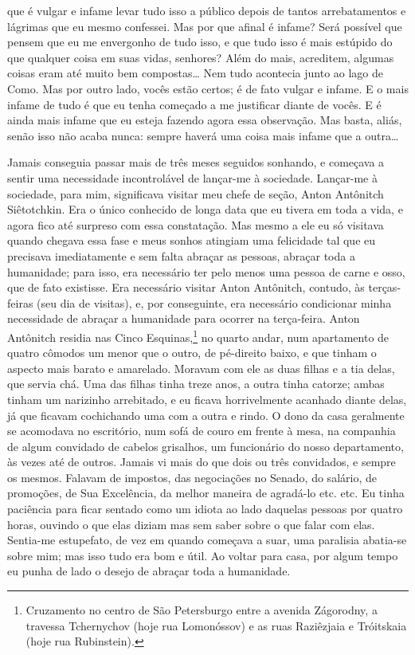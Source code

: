 que é vulgar e infame levar tudo isso a público depois de tantos
arrebatamentos e lágrimas que eu mesmo confessei. Mas por que afinal é
infame? Será possível que pensem que eu me envergonho de tudo isso, e
que tudo isso é mais estúpido do que qualquer coisa em suas vidas,
senhores? Além do mais, acreditem, algumas coisas eram até muito bem
compostas\ldots{} Nem tudo acontecia junto ao lago de Como. Mas por outro
lado, vocês estão certos; é de fato vulgar e infame. E o mais infame de
tudo é que eu tenha começado a me justificar diante de vocês. E é ainda
mais infame que eu esteja fazendo agora essa observação. Mas basta,
aliás, senão isso não acaba nunca: sempre haverá uma coisa mais infame
que a outra\ldots{}

Jamais conseguia passar mais de três meses seguidos sonhando, e começava
a sentir uma necessidade incontrolável de lançar-me à sociedade. Lançar-me
à sociedade, para mim, significava visitar meu chefe de seção, Anton
Antônitch Siêtotchkin. Era o único conhecido de longa data que eu
tivera em toda a vida, e agora fico até surpreso com essa constatação.
Mas mesmo a ele eu só visitava quando chegava essa fase e meus sonhos
atingiam uma felicidade tal que eu precisava imediatamente e sem falta
abraçar as pessoas, abraçar toda a humanidade; para isso, era
necessário ter pelo menos uma pessoa de carne e osso, que de fato
existisse. Era necessário visitar Anton Antônitch, contudo, às
terças-feiras (seu dia de visitas), e, por conseguinte, era necessário
condicionar minha necessidade de abraçar a humanidade para ocorrer na
terça-feira. Anton Antônitch residia nas Cinco Esquinas,\footnote{
Cruzamento no centro de São Petersburgo entre a avenida Zágorodny, a
travessa Tchernychov (hoje rua Lomonóssov) e as ruas Raziêzjaia e
Tróitskaia (hoje rua Rubinstein).} no quarto andar, num apartamento de
quatro cômodos um menor que o outro, de pé-direito baixo, e que tinham
o aspecto mais barato e amarelado. Moravam com ele as duas filhas e a
tia delas, que servia chá. Uma das filhas tinha treze anos, a outra
tinha catorze; ambas tinham um narizinho arrebitado, e eu ficava
horrivelmente acanhado diante delas, já que ficavam cochichando uma com
a outra e rindo. O dono da casa geralmente se acomodava no escritório,
num sofá de couro em frente à mesa, na companhia de algum convidado de
cabelos grisalhos, um funcionário do nosso departamento, às vezes até
de outros. Jamais vi mais do que dois ou três convidados, e sempre os
mesmos. Falavam de impostos, das negociações no Senado, do salário, de
promoções, de Sua Excelência, da melhor maneira de agradá-lo etc. etc.
Eu tinha paciência para ficar sentado como um idiota ao lado daquelas
pessoas por quatro horas, ouvindo o que elas diziam mas sem saber sobre
o que falar com elas. Sentia-me estupefato, de vez em quando começava a
suar, uma paralisia abatia-se sobre mim; mas isso tudo era bom e útil.
Ao voltar para casa, por algum tempo eu punha de lado o desejo de
abraçar toda a humanidade.

